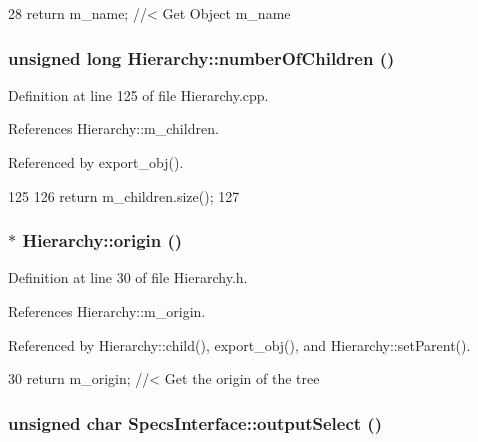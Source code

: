 \begin{DoxyCode}
28 { return m_name; } //< Get Object m_name
\end{DoxyCode}
\hypertarget{classHierarchy_ab16e84de65fd84e14001a6cf941c8be4}{
\subsubsection[{numberOfChildren}]{\setlength{\rightskip}{0pt plus 5cm}unsigned long Hierarchy::numberOfChildren ()}}
\label{classHierarchy_ab16e84de65fd84e14001a6cf941c8be4}


Definition at line 125 of file Hierarchy.cpp.

References Hierarchy::m\_\-children.

Referenced by export\_\-obj().


\begin{DoxyCode}
125                                            {
126   return m_children.size();
127 }
\end{DoxyCode}
\hypertarget{classHierarchy_aee461dc930ce3871636ff87f075b1b83}{
\subsubsection[{origin}]{$\ast$ Hierarchy::origin ()}}
\label{classHierarchy_aee461dc930ce3871636ff87f075b1b83}


Definition at line 30 of file Hierarchy.h.

References Hierarchy::m\_\-origin.

Referenced by Hierarchy::child(), export\_\-obj(), and Hierarchy::setParent().


\begin{DoxyCode}
30 { return m_origin; }  //< Get the origin of the tree
\end{DoxyCode}
\hypertarget{classSpecsInterface_ab291ed03f4c2f0143e14c26ad5f648dd}{
\subsubsection[{outputSelect}]{\setlength{\rightskip}{0pt plus 5cm}unsigned char SpecsInterface::outputSelect ()}}
\label{classSpecsInterface_ab291ed03f4c2f0143e14c26ad5f648dd}


